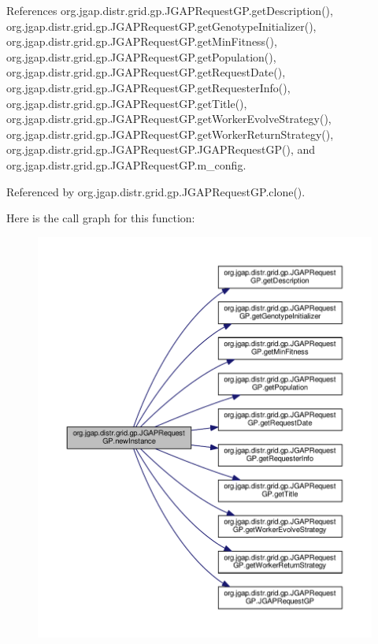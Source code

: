 References org.\-jgap.\-distr.\-grid.\-gp.\-J\-G\-A\-P\-Request\-G\-P.\-get\-Description(), org.\-jgap.\-distr.\-grid.\-gp.\-J\-G\-A\-P\-Request\-G\-P.\-get\-Genotype\-Initializer(), org.\-jgap.\-distr.\-grid.\-gp.\-J\-G\-A\-P\-Request\-G\-P.\-get\-Min\-Fitness(), org.\-jgap.\-distr.\-grid.\-gp.\-J\-G\-A\-P\-Request\-G\-P.\-get\-Population(), org.\-jgap.\-distr.\-grid.\-gp.\-J\-G\-A\-P\-Request\-G\-P.\-get\-Request\-Date(), org.\-jgap.\-distr.\-grid.\-gp.\-J\-G\-A\-P\-Request\-G\-P.\-get\-Requester\-Info(), org.\-jgap.\-distr.\-grid.\-gp.\-J\-G\-A\-P\-Request\-G\-P.\-get\-Title(), org.\-jgap.\-distr.\-grid.\-gp.\-J\-G\-A\-P\-Request\-G\-P.\-get\-Worker\-Evolve\-Strategy(), org.\-jgap.\-distr.\-grid.\-gp.\-J\-G\-A\-P\-Request\-G\-P.\-get\-Worker\-Return\-Strategy(), org.\-jgap.\-distr.\-grid.\-gp.\-J\-G\-A\-P\-Request\-G\-P.\-J\-G\-A\-P\-Request\-G\-P(), and org.\-jgap.\-distr.\-grid.\-gp.\-J\-G\-A\-P\-Request\-G\-P.\-m\-\_\-config.



Referenced by org.\-jgap.\-distr.\-grid.\-gp.\-J\-G\-A\-P\-Request\-G\-P.\-clone().



Here is the call graph for this function\-:
\nopagebreak
\begin{figure}[H]
\begin{center}
\leavevmode
\includegraphics[width=350pt]{classorg_1_1jgap_1_1distr_1_1grid_1_1gp_1_1_j_g_a_p_request_g_p_a356cc1ffb6831019794361715548f084_cgraph}
\end{center}
\end{figure}


